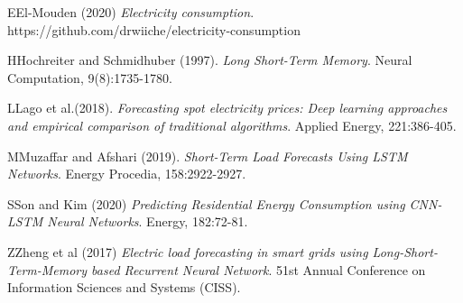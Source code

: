\documentclass[10pt,twocolumn,letterpaper]{article}
\begin{document}
\begin{thebibliography}{}

\bibitem  EEl-Mouden (2020)
\textit {Electricity consumption}.
https://github.com/drwiiche/electricity-consumption


\bibitem  HHochreiter and Schmidhuber (1997).
\textit {Long Short-Term Memory}.
Neural Computation, 9(8):1735-1780.

\bibitem LLago et al.(2018).
\textit{Forecasting spot electricity prices: Deep learning approaches and empirical comparison of traditional algorithms}. 
Applied Energy, 221:386-405.

\bibitem  MMuzaffar and Afshari (2019).
\textit{Short-Term Load Forecasts Using LSTM Networks}. 
Energy Procedia, 158:2922-2927.

\bibitem   SSon and Kim (2020)
\textit{Predicting Residential Energy Consumption using CNN-LSTM Neural Networks}. 
Energy, 182:72-81.

\bibitem    ZZheng  et  al (2017)
\textit{Electric load forecasting in smart grids using Long-Short-Term-Memory based Recurrent Neural Network}. 
51st Annual Conference on Information Sciences and Systems (CISS).





\end{thebibliography}
\end{document}
